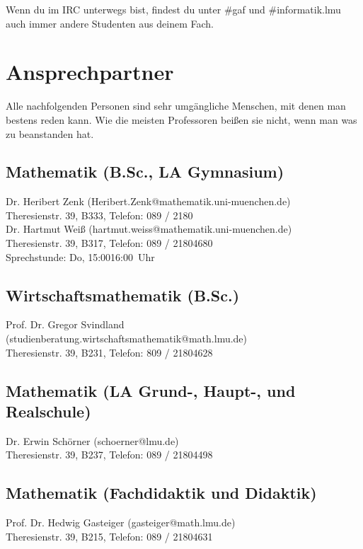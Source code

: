 Wenn du im IRC unterwegs bist, findest du unter \#gaf und \#informatik.lmu
auch immer andere Studenten aus deinem Fach.

\begin{urlList}
\end{urlList}

\section{Ansprechpartner}

Alle nachfolgenden Personen sind sehr umgängliche Menschen, mit denen
man bestens reden kann. Wie die meisten Professoren beißen sie nicht,
wenn man was zu beanstanden hat.

\subsection*{Mathematik (B.Sc., LA Gymnasium)}
Dr. Heribert Zenk (Heribert.Zenk@mathematik.uni-muenchen.de)\\
Theresienstr. 39, B333, Telefon: 089 / 2180\\

Dr. Hartmut Weiß (hartmut.weiss@mathematik.uni-muenchen.de)\\
Theresienstr. 39, B317, Telefon: 089 / 2180\emd{}4680\\
Sprechstunde: Do, 15:00\emd{}16:00~Uhr

\subsection*{Wirtschaftsmathematik (B.Sc.)}
Prof. Dr. Gregor Svindland (studienberatung.wirtschaftsmathematik@math.lmu.de)\\
Theresienstr. 39, B231, Telefon: 809 / 2180\emd{}4628\\

\subsection*{Mathematik (LA Grund-, Haupt-, und Realschule)}
Dr. Erwin Schörner (schoerner@lmu.de)\\
Theresienstr. 39, B237, Telefon: 089 / 2180\emd{}4498\\

\subsection*{Mathematik (Fachdidaktik und Didaktik)}
Prof. Dr. Hedwig Gasteiger (gasteiger@math.lmu.de)\\
Theresienstr. 39, B215, Telefon: 089 / 2180\emd{}4631\\

